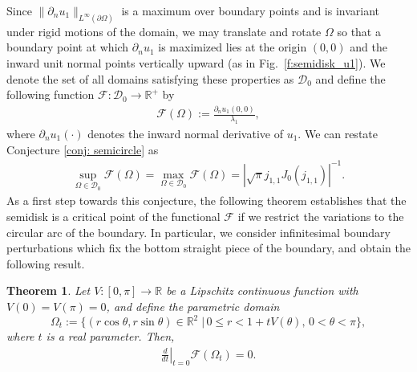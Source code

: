 \documentclass{amsart}
\theoremstyle{plain}
\newtheorem{theorem}{Theorem}
\begin{document}
Since $\|\partial_n u_1\|_{L^\infty(\partial\Omega)}$ is a maximum over boundary points and is invariant under rigid motions of the domain, we may translate and rotate $\Omega$ so that
a boundary point at which $\partial_n u_1$ is maximized lies at the origin $(0,0)$
and the inward unit normal points vertically upward (as in Fig.~\ref{f:semidisk_u1}).
We denote the set of all domains satisfying these properties as $\mathcal{D}_0$ and define the following function $\mathcal{F}:\mathcal{D}_0 \to \mathbb{R}^+$ by
  \begin{align}\label{eqn: definition of functional}
    \mathcal{F}(\Omega):=\frac{\partial_n u_1(0,0)}{\lambda_1},
  \end{align}
where $\partial_n u_1(\cdot)$ denotes the inward normal derivative of $u_1$. We can restate Conjecture \ref{conj: semicircle} as
  \begin{align}
    \sup_{\Omega\in\mathcal{D}_0} \mathcal{F}(\Omega)
    =\max_{\Omega\in\mathcal{D}_0} \mathcal{F}(\Omega)
    = |\sqrt{\pi}j_{1,1}J_0(j_{1,1})|^{-1}.
  \end{align}
As a first step towards this conjecture, the following theorem establishes that the semidisk is a critical point of the functional $\mathcal{F}$ if we restrict the variations to the circular arc of the boundary. In particular, we consider infinitesimal boundary perturbations which fix the bottom straight piece of the boundary, and obtain the following result.

\begin{theorem}\label{thm: critical point}
Let $V:[0,\pi] \to \mathbb{R}$ be a Lipschitz continuous function
with $V(0) = V(\pi) = 0$, and
define the parametric domain $$\Omega_t :=\{(r \cos \theta, r\sin \theta) \in \mathbb{R}^2\;|\, 0\le r < 1+t V(\theta), \, 0<\theta<\pi \},$$
where $t$ is a real parameter. Then, 
  \begin{align}
    \left.\frac{d}{dt}\right|_{t=0}{\mathcal{F}}(\Omega_t) = 0.
  \end{align}
\end{theorem}
\end{document}
